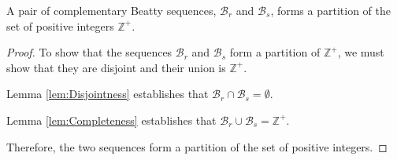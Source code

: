 \begin{theorem}
    \label{thm:Rayleighs_Theorem}
    A pair of complementary Beatty sequences, $\mathcal{B}_r$ and $\mathcal{B}_s$, forms a partition of the set of positive integers $\mathbb{Z}^+$.
\end{theorem}

\begin{proof}
    To show that the sequences $\mathcal{B}_r$ and $\mathcal{B}_s$ form a partition of $\mathbb{Z}^+$, we must show that they are disjoint and their union is $\mathbb{Z}^+$.

    Lemma \ref{lem:Disjointness} establishes that $\mathcal{B}_r \cap \mathcal{B}_s = \emptyset$.

    Lemma \ref{lem:Completeness} establishes that $\mathcal{B}_r \cup \mathcal{B}_s = \mathbb{Z}^+$.

    Therefore, the two sequences form a partition of the set of positive integers.
\end{proof}
